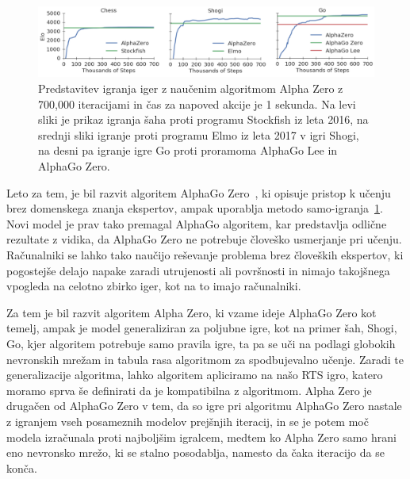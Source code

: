 \documentclass[a4paper, 12pt]{book}
\begin{document}
\begin{figure}[h]
	\begin{center}
		\includegraphics[width=1\textwidth]{photos/go.pdf}
	\end{center}
	\caption{Predstavitev igranja iger z naučenim algoritmom Alpha Zero z 700,000 iteracijami in čas za napoved akcije je 1 sekunda. Na levi sliki je prikaz igranja šaha proti programu Stockfish iz leta 2016, na srednji sliki igranje proti programu Elmo iz leta 2017 v igri Shogi, na desni pa igranje igre Go proti proramoma AlphaGo Lee in AlphaGo Zero. }
	\label{picCompareGo}
\end{figure}

Leto za tem, je bil razvit algoritem AlphaGo Zero~\cite{silver2017mastering}, ki opisuje pristop k učenju brez domenskega znanja ekspertov, ampak uporablja metodo samo-igranja~\ref{picCompareGo}. 
Novi model je prav tako premagal AlphaGo algoritem, kar predstavlja odlične rezultate z vidika, da AlphaGo Zero ne potrebuje človeško usmerjanje pri učenju.
Računalniki se lahko tako naučijo reševanje problema brez človeških ekspertov, ki pogostejše delajo napake zaradi utrujenosti ali površnosti in nimajo takojšnega vpogleda na celotno zbirko iger, kot na to imajo računalniki.

Za tem je bil razvit algoritem Alpha Zero, ki vzame ideje AlphaGo Zero kot temelj, ampak je model generaliziran za poljubne igre, kot na primer šah, Shogi, Go, kjer algoritem potrebuje samo pravila igre, ta pa se uči na podlagi globokih nevronskih mrežam in tabula rasa algoritmom za spodbujevalno učenje.
Zaradi te generalizacije algoritma, lahko algoritem apliciramo na našo RTS igro, katero moramo sprva še definirati da je kompatibilna z algoritmom.
Alpha Zero je drugačen od AlphaGo Zero v tem, da so igre pri algoritmu AlphaGo Zero nastale z igranjem vseh posameznih modelov prejšnjih iteracij, in se je potem moč modela izračunala proti najboljšim igralcem, medtem ko Alpha Zero samo hrani eno nevronsko mrežo, ki se stalno posodablja, namesto da čaka iteracijo da se konča.
\end{document}
